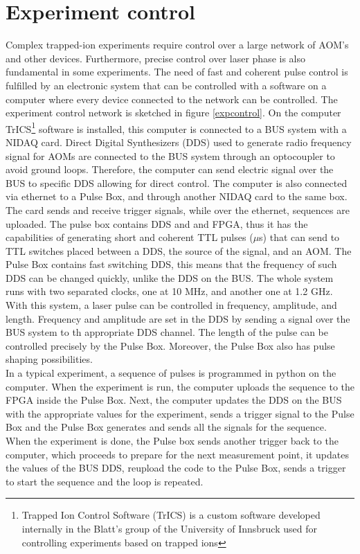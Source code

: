 \section{Experiment control}
Complex trapped-ion experiments require control over a large network of AOM's and other devices. Furthermore, precise control over laser phase is also fundamental in some experiments. The need of fast and coherent pulse control is fulfilled by an electronic system that can be controlled with a software on a computer where every device connected to the network can be controlled. The experiment control network is sketched in figure \ref{expcontrol}. On the computer TrICS\footnote{Trapped Ion Control Software (TrICS) is a custom software developed internally in the Blatt's group of the University of Innsbruck used for controlling experiments based on trapped ions} software is installed, this computer is connected to a BUS system with a NIDAQ card. Direct Digital Synthesizers (DDS) used to generate radio frequency signal for AOMs are connected to the BUS system through an optocoupler to avoid ground loops. Therefore, the computer can send electric signal over the BUS to specific DDS allowing for direct control. The computer is also connected via ethernet to a Pulse Box, and through another NIDAQ card to the same box. The card sends and receive trigger signals, while over the ethernet, sequences are uploaded. The pulse box contains DDS and and FPGA, thus it has the capabilities of generating short and coherent TTL pulses ($\mu$s) that can send to TTL switches placed between a DDS, the source of the signal, and an AOM. The Pulse Box contains fast switching DDS, this means that the frequency of such DDS can be changed quickly, unlike the DDS on the BUS. The whole system runs with two separated clocks, one at 10 MHz, and another one at 1.2 GHz.\\
With this system, a laser pulse can be controlled in frequency, amplitude, and length. Frequency and amplitude are set in the DDS by sending a signal over the BUS system to th appropriate DDS channel. The length of the pulse can be controlled precisely by the Pulse Box. Moreover, the Pulse Box also has pulse shaping possibilities.\\
In a typical experiment, a sequence of pulses is programmed in python on the computer. When the experiment is run, the computer uploads the sequence to the FPGA inside the Pulse Box. Next, the computer updates the DDS on the BUS with the appropriate values for the experiment, sends a trigger signal to the Pulse Box and the Pulse Box generates and sends all the signals for the sequence. When the experiment is done, the Pulse box sends another trigger back to the computer, which proceeds to prepare for the next measurement point, it updates the values of the BUS DDS, reupload the code to the Pulse Box, sends a trigger to start the sequence and the loop is repeated.

